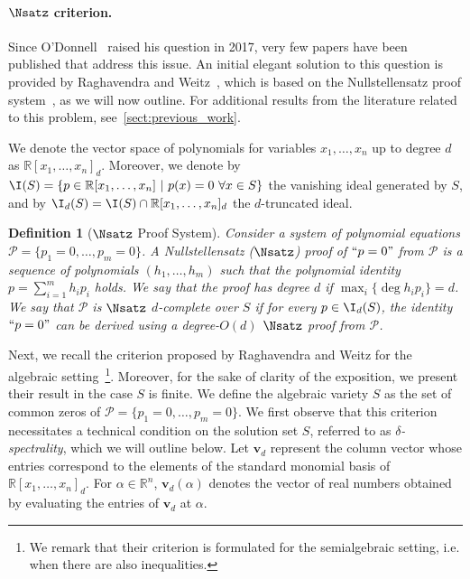 \documentclass[11pt]{article}
\newtheorem{definition}[theorem]{Definition}
\begin{document}
%
\paragraph{$\Nsatz$ criterion.}
Since O'Donnell~\cite{odonnell2017} raised his question in 2017, very few papers have been published that address this issue. An initial elegant solution to this question is provided by Raghavendra and Weitz~\cite{raghavendra_weitz2017}, which is based on the Nullstellensatz proof system~\cite{BeameIKPP94}, as we will now outline. For additional results from the literature related to this problem, see~\cref{sect:previous_work}.

We denote the vector space of polynomials for variables $x_1, \ldots, x_n$ up to degree $d$ as $\mathbb{R}[x_1, \dots, x_n]_d$. Moreover, we denote by $\I(S) = \{p \in \mathbb{R}[x_1,\ldots, x_n] \ | \ p(x) = 0 \  \forall x \in S\}$ the vanishing ideal generated by $S$, and by $\I_{d}(S) = \I(S) \cap \mathbb{R}[x_1, \ldots, x_n]_{d}$ the $d$-truncated ideal.  
\begin{definition}[$\Nsatz$ Proof System]\label{def:d-completeness}
    Consider a system of polynomial equations $\mathcal{P}=\{p_1=0,\ldots,p_m=0\}$. A \emph{Nullstellensatz ($\Nsatz$) proof} of $``p=0"$ from $\mathcal{P}$ is a sequence of polynomials $(h_1,\ldots,h_m)$ such that the polynomial identity $p=\sum_{i=1}^m h_ip_i$ holds. We say that the proof has degree $d$ if $\max_i\{\deg h_ip_i\}=d$.  We say that $\mathcal{P}$ is $\Nsatz$ \emph{$d$-complete} over $S$ if for every $p\in \I_{d}(S)$, the identity $``p=0"$ can be derived using a degree-$O(d)$ $\Nsatz$ proof from $\mathcal{P}$.
\end{definition}
Next, we recall the criterion proposed by Raghavendra and Weitz for the algebraic setting~\footnote{We remark that their criterion is formulated for the semialgebraic setting, i.e. when there are also inequalities.}. Moreover, for the sake of clarity of the exposition, we present their result in the case $S$ is finite. We define the algebraic variety \(S\) as the set of common zeros of \(\mathcal{P}=\{p_1=0,\ldots,p_m=0\}\). We first observe that this criterion necessitates a technical condition on the solution set \( S \), referred to as \emph{\(\delta\)-spectrality}, which we will outline below.
%
Let \(\mathbf{v}_d\) represent the column vector whose entries correspond to the elements of the standard monomial basis of \(\mathbb{R}[x_1, \dots, x_n]_d\). For \(\alpha \in \mathbb{R}^n\), \(\mathbf{v}_d(\alpha)\) denotes the vector of real numbers obtained by evaluating the entries of \(\mathbf{v}_d\) at \(\alpha\). 
\end{document}
